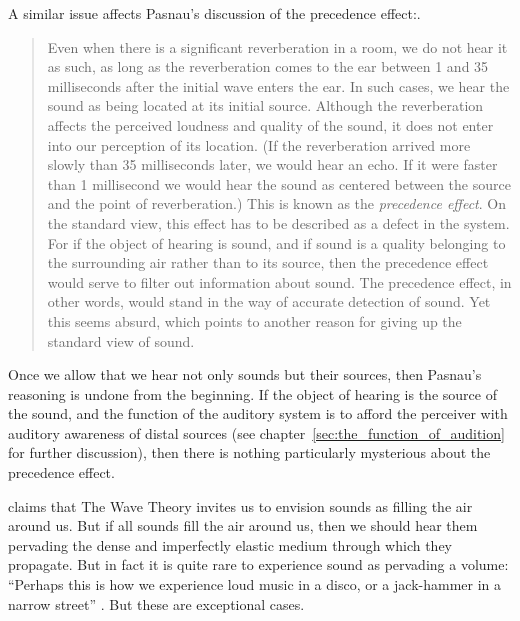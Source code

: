 A similar issue affects Pasnau's discussion of the precedence effect:. 
\begin{quote}
	Even when there is a significant reverberation in a room, we do not hear it as such, as long as the reverberation comes to the ear between 1 and 35 milliseconds after the initial wave enters the ear. In such cases, we hear the sound as being located at its initial source. Although the reverberation affects the perceived loudness and quality of the sound, it does not enter into our perception of its location. (If the reverberation arrived more slowly than 35 milliseconds later, we would hear an echo. If it were faster than 1 millisecond we would hear the sound as centered between the source and the point of reverberation.) This is known as the \emph{precedence effect}. On the standard view, this effect has to be described as a defect in the system. For if the object of hearing is sound, and if sound is a quality belonging to the surrounding air rather than to its source, then the precedence effect would serve to filter out information about sound. The precedence effect, in other words, would stand in the way of accurate detection of sound. Yet this seems absurd, which points to another reason for giving up the standard view of sound. \citep[312--313]{Pasnau:1999ss}
\end{quote}
Once we allow that we hear not only sounds but their sources, then Pasnau's reasoning is undone from the beginning. If the object of hearing is the source of the sound, and the function of the auditory system is to afford the perceiver with auditory awareness of distal sources (see chapter~\ref{sec:the_function_of_audition} for further discussion), then there is nothing particularly mysterious about the precedence effect.

\citet[section 6]{Pasnau:1999ss} claims that The Wave Theory invites us to envision sounds as filling the air around us. But if all sounds fill the air around us, then we should hear them pervading the dense and imperfectly elastic medium through which they propagate. But in fact it is quite rare to experience sound as pervading a volume: ``Perhaps this is how we experience loud music in a disco, or a jack-hammer in a narrow street'' \citep[312]{Pasnau:1999ss}. But these are exceptional cases.

